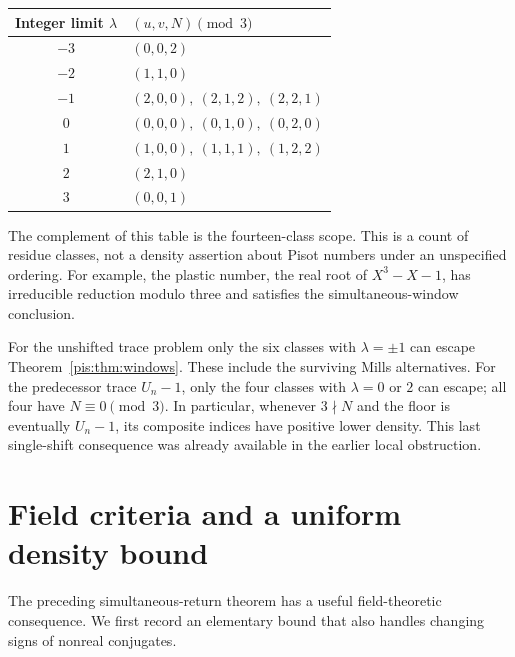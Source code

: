 \documentclass[11pt,a4paper]{article}
\theoremstyle{definition}\newtheorem{definition}[theorem]{Definition}
\theoremstyle{remark}\newtheorem{remark}[theorem]{Remark}
\begin{document}
\begin{center}
\begin{tabular}{c l}
\toprule
Integer limit $\lambda$ & $(u,v,N)\pmod3$\\
\midrule
$-3$ & $(0,0,2)$\\
$-2$ & $(1,1,0)$\\
$-1$ & $(2,0,0),\ (2,1,2),\ (2,2,1)$\\
$0$ & $(0,0,0),\ (0,1,0),\ (0,2,0)$\\
$1$ & $(1,0,0),\ (1,1,1),\ (1,2,2)$\\
$2$ & $(2,1,0)$\\
$3$ & $(0,0,1)$\\
\bottomrule
\end{tabular}
\end{center}
The complement of this table is the fourteen-class scope. This is
a count of residue classes, not a density assertion about Pisot
numbers under an unspecified ordering. For example, the plastic
number, the real root of $X^3-X-1$, has irreducible reduction modulo
three and satisfies the simultaneous-window conclusion.

For the unshifted trace problem only the six classes with
$\lambda=\pm1$ can escape Theorem~\ref{pis:thm:windows}. These include
the surviving Mills alternatives. For the predecessor trace
$U_n-1$, only the four classes with $\lambda=0$ or $2$ can escape;
all four have $N\equiv0\pmod3$. In particular, whenever
$3\nmid N$ and the floor is eventually $U_n-1$, its composite
indices have positive lower density. This last single-shift
consequence was already available in the earlier local obstruction.

\section{Field criteria and a uniform density bound}
\label{pis:local:sec:fields}
The preceding simultaneous-return theorem has a useful field-theoretic
consequence. We first record an elementary bound that also handles
changing signs of nonreal conjugates.
\end{document}

